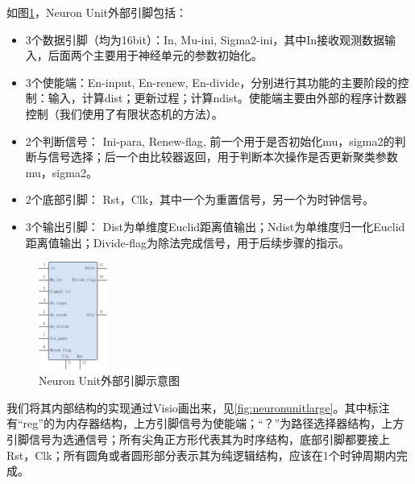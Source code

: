 如图\ref{fig:neuronunit}，Neuron Unit外部引脚包括：
\begin{itemize}
\item 3个数据引脚（均为16bit）：In, Mu-ini, Sigma2-ini，其中In接收观测数据输入，后面两个主要用于神经单元的参数初始化。

\item 3个使能端：En-input, En-renew, En-divide，分别进行其功能的主要阶段的控制：输入，计算dist；更新过程；计算ndist。使能端主要由外部的程序计数器控制（我们使用了有限状态机的方法）。

\item 2个判断信号： Ini-para, Renew-flag, 前一个用于是否初始化mu，sigma2的判断与信号选择；后一个由比较器返回，用于判断本次操作是否更新聚类参数mu，sigma2。

\item 2个底部引脚： Rst，Clk，其中一个为重置信号，另一个为时钟信号。

\item 3个输出引脚： Dist为单维度Euclid距离值输出；Ndist为单维度归一化Euclid距离值输出；Divide-flag为除法完成信号，用于后续步骤的指示。
\end{itemize}



\begin{figure}[htbp]
   \centering
   \includegraphics[width=0.2\textwidth]{NeuronUnit.png} %
   \caption{Neuron Unit外部引脚示意图}
   \label{fig:neuronunit}
\end{figure}

我们将其内部结构的实现通过Visio画出来，见\ref{fig:neuronunitlarge}。其中标注有“reg”的为内存器结构，上方引脚信号为使能端；“？”为路径选择器结构，上方引脚信号为选通信号；所有尖角正方形代表其为时序结构，底部引脚都要接上Rst，Clk；所有圆角或者圆形部分表示其为纯逻辑结构，应该在1个时钟周期内完成。

